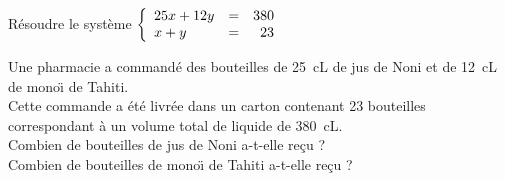 \begin{myenumerate}
\item Résoudre le système $\left\{\begin{array}{l c r}
25x + 12y&=&380\\
x + y&=&23\\
\end{array}\right.$
\item Une pharmacie a commandé des bouteilles de 25~cL de jus de Noni et de 12~cL de mono\"{\i} de Tahiti.\\
 Cette commande a été livrée dans un carton contenant 23 bouteilles correspondant à un volume total de liquide de 380~cL.\\
Combien de bouteilles de jus de Noni a-t-elle reçu ?\\
Combien de bouteilles de mono\"{\i} de Tahiti a-t-elle reçu ?
\end{myenumerate}